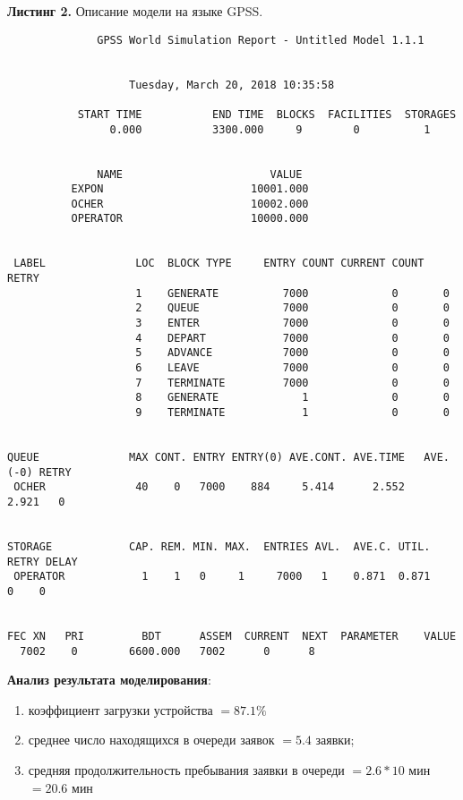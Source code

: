 \documentclass[a4paper, 12pt]{article}   	%
\begin{document}
    \noindent\textbf{Листинг 2.} Описание модели на языке GPSS.
\begin{verbatim}
              GPSS World Simulation Report - Untitled Model 1.1.1


                   Tuesday, March 20, 2018 10:35:58  

           START TIME           END TIME  BLOCKS  FACILITIES  STORAGES
                0.000           3300.000     9        0          1


              NAME                       VALUE  
          EXPON                       10001.000
          OCHER                       10002.000
          OPERATOR                    10000.000


 LABEL              LOC  BLOCK TYPE     ENTRY COUNT CURRENT COUNT RETRY
                    1    GENERATE          7000             0       0
                    2    QUEUE             7000             0       0
                    3    ENTER             7000             0       0
                    4    DEPART            7000             0       0
                    5    ADVANCE           7000             0       0
                    6    LEAVE             7000             0       0
                    7    TERMINATE         7000             0       0
                    8    GENERATE             1             0       0
                    9    TERMINATE            1             0       0


QUEUE              MAX CONT. ENTRY ENTRY(0) AVE.CONT. AVE.TIME   AVE.(-0) RETRY
 OCHER              40    0   7000    884     5.414      2.552      2.921   0


STORAGE            CAP. REM. MIN. MAX.  ENTRIES AVL.  AVE.C. UTIL. RETRY DELAY
 OPERATOR            1    1   0     1     7000   1    0.871  0.871    0    0


FEC XN   PRI         BDT      ASSEM  CURRENT  NEXT  PARAMETER    VALUE
  7002    0        6600.000   7002      0      8
\end{verbatim}
    

    \textbf{Анализ результата моделирования}:
    \begin{enumerate}
        \item коэффициент загрузки устройства $= 87.1 \%$
        \item среднее число находящихся в очереди заявок $= 5.4$ заявки;
        \item средняя продолжительность пребывания заявки в очереди $= 2.6 * 10$ мин $= 20.6$ мин 
    \end{enumerate}
    
\end{document}
